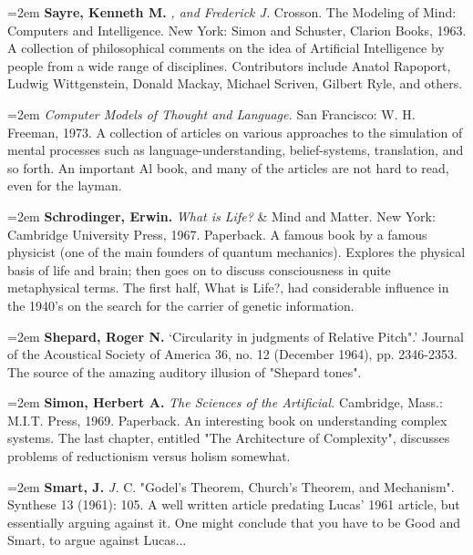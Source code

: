 \par\noindent\hangindent=2em {\bf Sayre, Kenneth M.} {\it , and Frederick J.} Crosson. The Modeling of Mind: Computers and Intelligence. New York: Simon and Schuster, Clarion Books, 1963. A collection of philosophical comments on the idea of Artificial Intelligence by people from a wide range of disciplines. Contributors include Anatol Rapoport, Ludwig Wittgenstein, Donald Mackay, Michael Scriven, Gilbert Ryle, and others.

\par\noindent\hangindent=2em  {\it Computer Models of Thought and Language.} San Francisco: W. H. Freeman, 1973. A collection of articles on various approaches to the simulation of mental processes such as language-understanding, belief-systems, translation, and so forth. An important Al book, and many of the articles are not hard to read, even for the layman.

\par\noindent\hangindent=2em {\bf Schrodinger, Erwin.} {\it What is Life?} \& Mind and Matter. New York: Cambridge University Press, 1967. Paperback. A famous book by a famous physicist (one of the main founders of quantum mechanics). Explores the physical basis of life and brain; then goes on to discuss consciousness in quite metaphysical terms. The first half, What is Life?, had considerable influence in the 1940's on the search for the carrier of genetic information.

\par\noindent\hangindent=2em {\bf Shepard, Roger N.} `Circularity in judgments of Relative Pitch".' Journal of the Acoustical Society of America 36, no. 12 (December 1964), pp. 2346-2353. The source of the amazing auditory illusion of "Shepard tones".

\par\noindent\hangindent=2em {\bf Simon, Herbert A.} {\it The Sciences of the Artificial.} Cambridge, Mass.: M.I.T. Press, 1969. Paperback. An interesting book on understanding complex systems. The last chapter, entitled "The Architecture of Complexity", discusses problems of reductionism versus holism somewhat.

\par\noindent\hangindent=2em {\bf Smart, J.} {\it J.} C. "Godel's Theorem, Church's Theorem, and Mechanism". Synthese 13 (1961): 105. A well written article predating Lucas' 1961 article, but essentially arguing against it. One might conclude that you have to be Good and Smart, to argue against Lucas...


